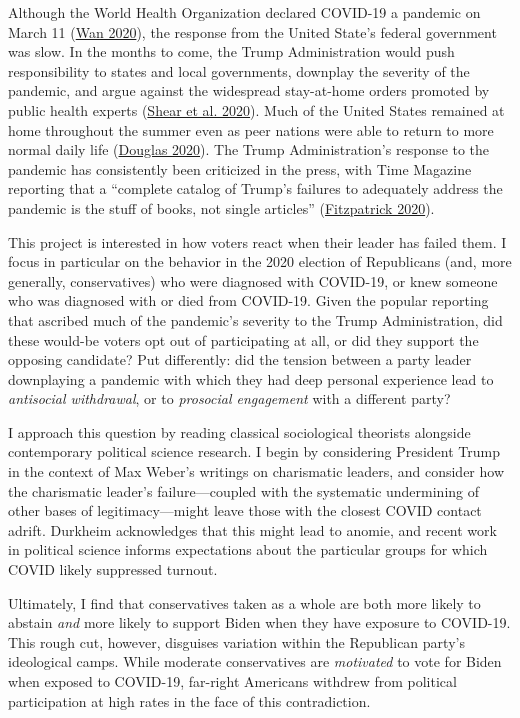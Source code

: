\documentclass[
  12pt,
]{article}
\begin{document}
Although the World Health Organization declared COVID-19 a pandemic on March 11 (\protect\hyperlink{ref-Wan2020}{Wan 2020}), the response from the United State's federal government was slow. In the months to come, the Trump Administration would push responsibility to states and local governments, downplay the severity of the pandemic, and argue against the widespread stay-at-home orders promoted by public health experts (\protect\hyperlink{ref-Shear2020}{Shear et al. 2020}). Much of the United States remained at home throughout the summer even as peer nations were able to return to more normal daily life (\protect\hyperlink{ref-Douglas2020}{Douglas 2020}). The Trump Administration's response to the pandemic has consistently been criticized in the press, with Time Magazine reporting that a ``complete catalog of Trump's failures to adequately address the pandemic is the stuff of books, not single articles'' (\protect\hyperlink{ref-Fitzpatrick2020}{Fitzpatrick 2020}).

This project is interested in how voters react when their leader has failed them. I focus in particular on the behavior in the 2020 election of Republicans (and, more generally, conservatives) who were diagnosed with COVID-19, or knew someone who was diagnosed with or died from COVID-19. Given the popular reporting that ascribed much of the pandemic's severity to the Trump Administration, did these would-be voters opt out of participating at all, or did they support the opposing candidate? Put differently: did the tension between a party leader downplaying a pandemic with which they had deep personal experience lead to \emph{antisocial withdrawal}, or to \emph{prosocial engagement} with a different party?

I approach this question by reading classical sociological theorists alongside contemporary political science research. I begin by considering President Trump in the context of Max Weber's writings on charismatic leaders, and consider how the charismatic leader's failure---coupled with the systematic undermining of other bases of legitimacy---might leave those with the closest COVID contact adrift. Durkheim acknowledges that this might lead to anomie, and recent work in political science informs expectations about the particular groups for which COVID likely suppressed turnout.

Ultimately, I find that conservatives taken as a whole are both more likely to abstain \emph{and} more likely to support Biden when they have exposure to COVID-19. This rough cut, however, disguises variation within the Republican party's ideological camps. While moderate conservatives are \emph{motivated} to vote for Biden when exposed to COVID-19, far-right Americans withdrew from political participation at high rates in the face of this contradiction.
\end{document}
